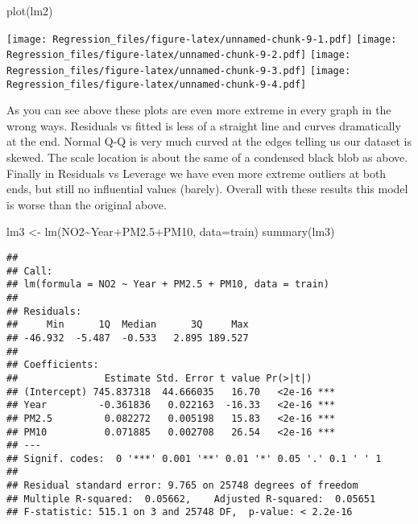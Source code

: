 \documentclass[
]{article}
\newenvironment{Shaded}{\begin{snugshade}}{\end{snugshade}}
\newcommand{\AttributeTok}[1]{\textcolor[rgb]{0.77,0.63,0.00}{#1}}
\newcommand{\FloatTok}[1]{\textcolor[rgb]{0.00,0.00,0.81}{#1}}
\newcommand{\FunctionTok}[1]{\textcolor[rgb]{0.00,0.00,0.00}{#1}}
\newcommand{\NormalTok}[1]{#1}
\newcommand{\OtherTok}[1]{\textcolor[rgb]{0.56,0.35,0.01}{#1}}
\newcommand{\SpecialCharTok}[1]{\textcolor[rgb]{0.00,0.00,0.00}{#1}}
\begin{document}
\begin{Shaded}
\begin{Highlighting}[]
\FunctionTok{plot}\NormalTok{(lm2)}
\end{Highlighting}
\end{Shaded}

\texttt{[image: Regression\_files/figure-latex/unnamed-chunk-9-1.pdf]}
\texttt{[image: Regression\_files/figure-latex/unnamed-chunk-9-2.pdf]}
\texttt{[image: Regression\_files/figure-latex/unnamed-chunk-9-3.pdf]}
\texttt{[image: Regression\_files/figure-latex/unnamed-chunk-9-4.pdf]}

As you can see above these plots are even more extreme in every graph in
the wrong ways. Residuals vs fitted is less of a straight line and
curves dramatically at the end. Normal Q-Q is very much curved at the
edges telling us our dataset is skewed. The scale location is about the
same of a condensed black blob as above. Finally in Residuals vs
Leverage we have even more extreme outliers at both ends, but still no
influential values (barely). Overall with these results this model is
worse than the original above.

\begin{Shaded}
\begin{Highlighting}[]
\NormalTok{lm3 }\OtherTok{\textless{}{-}} \FunctionTok{lm}\NormalTok{(NO2}\SpecialCharTok{\textasciitilde{}}\NormalTok{Year}\SpecialCharTok{+}\NormalTok{PM2}\FloatTok{.5}\SpecialCharTok{+}\NormalTok{PM10, }\AttributeTok{data=}\NormalTok{train)}
\FunctionTok{summary}\NormalTok{(lm3)}
\end{Highlighting}
\end{Shaded}

\begin{verbatim}
## 
## Call:
## lm(formula = NO2 ~ Year + PM2.5 + PM10, data = train)
## 
## Residuals:
##     Min      1Q  Median      3Q     Max 
## -46.932  -5.487  -0.533   2.895 189.527 
## 
## Coefficients:
##               Estimate Std. Error t value Pr(>|t|)    
## (Intercept) 745.837318  44.666035   16.70   <2e-16 ***
## Year         -0.361836   0.022163  -16.33   <2e-16 ***
## PM2.5         0.082272   0.005198   15.83   <2e-16 ***
## PM10          0.071885   0.002708   26.54   <2e-16 ***
## ---
## Signif. codes:  0 '***' 0.001 '**' 0.01 '*' 0.05 '.' 0.1 ' ' 1
## 
## Residual standard error: 9.765 on 25748 degrees of freedom
## Multiple R-squared:  0.05662,    Adjusted R-squared:  0.05651 
## F-statistic: 515.1 on 3 and 25748 DF,  p-value: < 2.2e-16
\end{verbatim}
\end{document}
